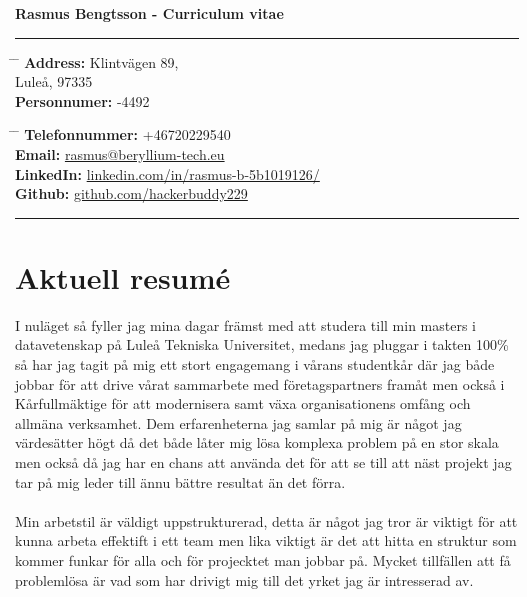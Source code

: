 \documentclass[a4paper]{article}
\begin{document}

\Large{\textbf{Rasmus Bengtsson - Curriculum vitae}}

\rule{\textwidth}{4px}



\normalsize{
\parbox{0.5\textwidth}{ %
\begin{tabbing} %
\hspace{3cm} \= \hspace{4cm} \= \kill %
{\bf Address:} \> Klintvägen 89,\\ %
\> Luleå, 97335 \\ %
{\bf Personnumer:} -4492 %
\end{tabbing}}
\hfill %
\parbox{0.5\textwidth}{ %
\begin{tabbing} %
\hspace{3cm} \= \hspace{4cm} \= \kill %
{\bf Telefonnummer:} \> +46720229540 \\ %
{\bf Email:} \> \href{mailto:rasmus@beryllium-tech.eu}{rasmus@beryllium-tech.eu} \\ %
{\bf LinkedIn:} \> \href{https://www.linkedin.com/in/rasmus-b-5b1019126/}{linkedin.com/in/rasmus-b-5b1019126/} \\ %
{\bf Github:} \> \href{https://www.github.com/hackerbuddy229}{github.com/hackerbuddy229} %
\end{tabbing}}}



\rule{0.5\textwidth}{2px}

\section{Aktuell resumé}

I nuläget så fyller jag mina dagar främst med att studera till min masters i datavetenskap
på Luleå Tekniska Universitet, medans jag pluggar i takten 100\% så har jag tagit på mig ett
stort engagemang i vårans studentkår där jag både jobbar för att drive vårat sammarbete med 
företagspartners framåt men också i Kårfullmäktige för att modernisera samt växa organisationens
omfång och allmäna verksamhet. Dem erfarenheterna jag samlar på mig är något jag värdesätter högt
då det både låter mig lösa komplexa problem på en stor skala men också då jag har en chans att
använda det för att se till att näst projekt jag tar på mig leder till ännu bättre resultat än det förra.
\\
\\
Min arbetstil är väldigt uppstrukturerad, detta är något jag tror är viktigt för att kunna 
arbeta effektift i ett team men lika viktigt är det att hitta en struktur som kommer
funkar för alla och för projecktet man jobbar på. Mycket tillfällen att få problemlösa är
vad som har drivigt mig till det yrket jag är intresserad av.
\end{document}
